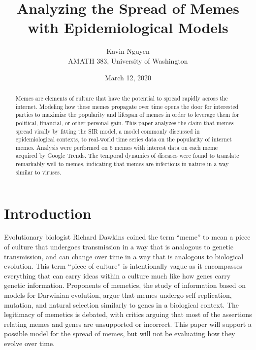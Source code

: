 \documentclass[12pt, letterpaper]{article}
\begin{document}
\title{\vspace{-2.0cm}Analyzing the Spread of Memes with Epidemiological Models}
\author{Kavin Nguyen \\ AMATH 383, University of Washington}
\date{March 12, 2020}
\maketitle

\begin{abstract}
Memes are elements of culture that have the potential to spread rapidly across the internet. Modeling how these memes propagate over time opens the door for interested parties to maximize the popularity and lifespan of memes in order to leverage them for political, financial, or other personal gain. This paper analyzes the claim that memes spread virally by fitting the SIR model, a model commonly discussed in epidemiological contexts, to real-world time series data on the popularity of internet memes. Analysis were performed on 6 memes with interest data on each meme acquired by Google Trends. The temporal dynamics of diseases were found to translate remarkably well to memes, indicating that memes are infectious in nature in a way similar to viruses. 
\end{abstract}

\section*{Introduction}

Evolutionary biologist Richard Dawkins coined the term “meme” to mean a piece of culture that undergoes transmission in a way that is analogous to genetic transmission, and can change over time in a way that is analogous to biological evolution. \cite{dawkins_1989} This term “piece of culture” is intentionally vague as it encompasses everything that can carry ideas within a culture much like how genes carry genetic information. Proponents of memetics, the study of information based on models for Darwinian evolution, argue that memes undergo self-replication, mutation, and natural selection similarly to genes in a biological context. The legitimacy of memetics is debated, with critics arguing that most of the assertions relating memes and genes are unsupported or incorrect. This paper will support a possible model for the spread of memes, but will not be evaluating how they evolve over time.
\end{document}
